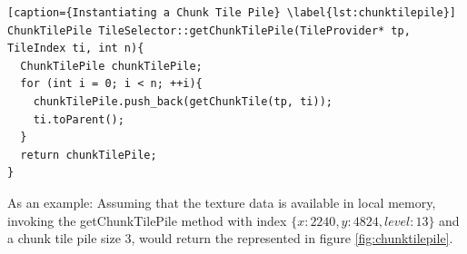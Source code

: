 \begin{lstlisting}[caption={Instantiating a Chunk Tile Pile} \label{lst:chunktilepile}]
ChunkTilePile TileSelector::getChunkTilePile(TileProvider* tp, TileIndex ti, int n){
  ChunkTilePile chunkTilePile;
  for (int i = 0; i < n; ++i){
    chunkTilePile.push_back(getChunkTile(tp, ti));
    ti.toParent();
  }
  return chunkTilePile;
}
\end{lstlisting}

As an example: 
Assuming that the texture data is available in local memory, invoking the getChunkTilePile method with index $\{x: 2240, y: 4824, level: 13 \}$ and a chunk tile pile size 3, would return the  represented in figure \ref{fig:chunktilepile}. 

